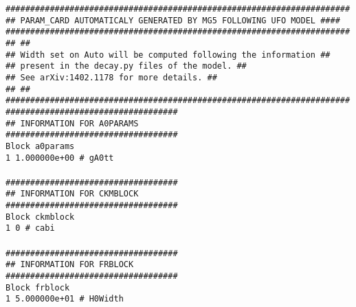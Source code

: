 \texttt{\#\#\#\#\#\#\#\#\#\#\#\#\#\#\#\#\#\#\#\#\#\#\#\#\#\#\#\#\#\#\#\#\#\#\#\#\#\#\#\#\#\#\#\#\#\#\#\#\#\#\#\#\#\#\#\#\#\#\#\#\#\#\#\#\#\#\#\#\#\#\\
\#\# PARAM\_CARD AUTOMATICALY GENERATED BY MG5 FOLLOWING UFO MODEL   \#\#\#\#\\
\#\#\#\#\#\#\#\#\#\#\#\#\#\#\#\#\#\#\#\#\#\#\#\#\#\#\#\#\#\#\#\#\#\#\#\#\#\#\#\#\#\#\#\#\#\#\#\#\#\#\#\#\#\#\#\#\#\#\#\#\#\#\#\#\#\#\#\#\#\#\\
\#\#                                                                  \#\#\\
\#\#  Width set on Auto will be computed following the information    \#\#\\
\#\#        present in the decay.py files of the model.               \#\#\\
\#\#        See  arXiv:1402.1178 for more details.                    \#\#\\
\#\#                                                                  \#\#\\
\#\#\#\#\#\#\#\#\#\#\#\#\#\#\#\#\#\#\#\#\#\#\#\#\#\#\#\#\#\#\#\#\#\#\#\#\#\#\#\#\#\#\#\#\#\#\#\#\#\#\#\#\#\#\#\#\#\#\#\#\#\#\#\#\#\#\#\#\#\#\\
\#\#\#\#\#\#\#\#\#\#\#\#\#\#\#\#\#\#\#\#\#\#\#\#\#\#\#\#\#\#\#\#\#\#\#\\
\#\# INFORMATION FOR A0PARAMS\\
\#\#\#\#\#\#\#\#\#\#\#\#\#\#\#\#\#\#\#\#\#\#\#\#\#\#\#\#\#\#\#\#\#\#\#\\
Block a0params \\
    1 1.000000e+00 \# gA0tt\\ 
\\
\#\#\#\#\#\#\#\#\#\#\#\#\#\#\#\#\#\#\#\#\#\#\#\#\#\#\#\#\#\#\#\#\#\#\#\\
\#\# INFORMATION FOR CKMBLOCK\\
\#\#\#\#\#\#\#\#\#\#\#\#\#\#\#\#\#\#\#\#\#\#\#\#\#\#\#\#\#\#\#\#\#\#\#\\
Block ckmblock \\
    1 0            \# cabi \\
\\
\#\#\#\#\#\#\#\#\#\#\#\#\#\#\#\#\#\#\#\#\#\#\#\#\#\#\#\#\#\#\#\#\#\#\#\\
\#\# INFORMATION FOR FRBLOCK\\
\#\#\#\#\#\#\#\#\#\#\#\#\#\#\#\#\#\#\#\#\#\#\#\#\#\#\#\#\#\#\#\#\#\#\#\\
Block frblock \\
    1 5.000000e+01 \# H0Width\\ 
}
